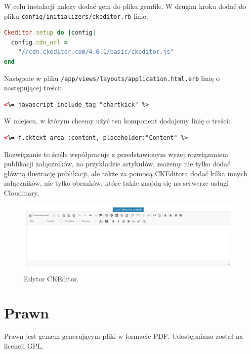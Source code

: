 \documentclass[openright]{xmgr}
\begin{document}
W celu instalacji należy dodać gem do pliku gemfile. W drugim kroku dodać do pliku \texttt{config/initializers/ckeditor.rb} linie: 
\begin{lstlisting}[language=ruby, caption={Framgent zawartości pliku ckeditor.rb}]
Ckeditor.setup do |config|
  config.cdn_url = 
	"//cdn.ckeditor.com/4.6.1/basic/ckeditor.js"
end
\end{lstlisting}

\newpage

Następnie w pliku \texttt{/app/views/layouts/application.html.erb} linię o następującej treści:
\begin{lstlisting}[language=html, caption={Framgent zawartości pliku application.html.rb}]
<%= javascript_include_tag "chartkick" %>
\end{lstlisting}
W miejscu, w którym chcemy użyć ten komponent dodajemy linię o treści:
\begin{lstlisting}[language=html, caption={Kod uruchamiajacy edytor}]
<%= f.cktext_area :content, placeholder:"Content" %>
\end{lstlisting}
Rozwiązanie to ściśle współpracuje z przedstawionym wyżej rozwiązaniem publikacji załączników, na przykładzie artykułów, możemy nie tylko dodać główną ilustrację publikacji, ale także za pomocą CKEditora dodać kilka innych załączników, nie tylko obrazków, które także znajdą się na serwerze usługi Cloudinary. 

\begin{figure}[!tbh]
\centering
\includegraphics[width=\linewidth]{fig/ckeditor}
\caption{Edytor CKEditor.}
\end{figure}

\newpage

\section{Prawn}
Prawn \cite{prawn} jest gemem generującym pliki w formacie PDF. Udostępniano został na licencji GPL.
\end{document}
